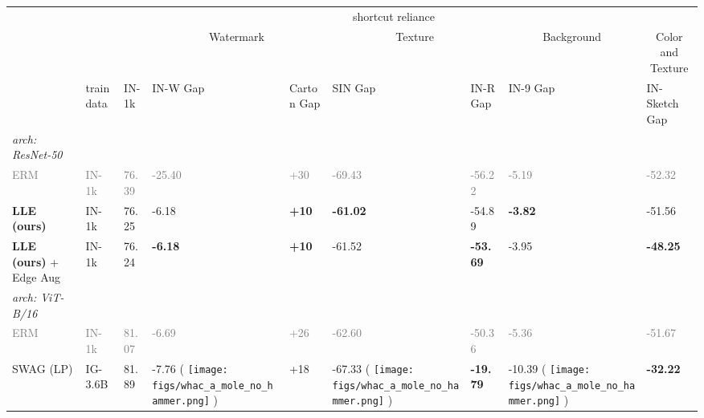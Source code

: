 \documentclass[10pt,twocolumn,letterpaper]{article}
\DeclareRobustCommand{\molenohammer}{\begingroup\normalfont
  \texttt{[image: figs/whac\_a\_mole\_no\_hammer.png]}\endgroup
}
\begin{document}
\begin{table*}[t]
\centering
\begin{adjustbox}{width=\linewidth}
\begin{tabular}{@{}lllllllll@{}}
\toprule
       &            & \multicolumn{1}{l|}{}      & \multicolumn{5}{c}{shortcut reliance}                                                                                 \\ \cmidrule(l){4-9}
       &            & \multicolumn{1}{c|}{}      & \multicolumn{2}{c|}{Watermark}             & \multicolumn{2}{c}{Texture}             & \multicolumn{1}{|c}{Background} & \multicolumn{1}{|c}{Color and Texture} \\
 & train data & \multicolumn{1}{l|}{IN-1k} & IN-W Gap & \multicolumn{1}{l|}{Carton Gap} & SIN Gap & \multicolumn{1}{l|}{IN-R Gap} & IN-9 Gap  & IN-Sketch Gap                     \\ \midrule
\textit{arch: ResNet-50}             &      &                    &          &           &          &         &      &           \\
\textcolor{gray}{ERM}              & \textcolor{gray}{IN-1k}      & \textcolor{gray}{76.39}       & \textcolor{gray}{-25.40}           & \textcolor{gray}{+30}          & \textcolor{gray}{-69.43}          & \textcolor{gray}{-56.22}          & \textcolor{gray}{-5.19}      &   \textcolor{gray}{-52.32}         \\
\textbf{LLE (ours)}    & IN-1k      & 76.25                   & -6.18             & \textbf{+10} & \textbf{-61.02} & -54.89 & \textbf{-3.82}   &    -51.56                     \\
\textbf{LLE (ours)} + Edge Aug    & IN-1k      & 76.24                   & \textbf{-6.18}             & \textbf{+10} & -61.52 & \textbf{-53.69} & -3.95    &    \textbf{-48.25}                   \\ \midrule
\textit{arch: ViT-B/16}             &      &                    &          &           &          &         &    &             \\
\textcolor{gray}{ERM}     & \textcolor{gray}{IN-1k}     & \textcolor{gray}{81.07}          & \textcolor{gray}{-6.69}   & \textcolor{gray}{+26}          & \textcolor{gray}{-62.60}    & \textcolor{gray}{-50.36}          & \textcolor{gray}{-5.36}    &   \textcolor{gray}{-51.67}         \\ \cmidrule{2-9}
SWAG (LP)              & IG-3.6B    & 81.89                  & -7.76  \scriptsize{(\textcolor{red}{} \molenohammer)}         & +18  & -67.33 \scriptsize{(\textcolor{red}{} \molenohammer)}         & \textbf{-19.79}           & -10.39 \scriptsize{(\textcolor{red}{} \molenohammer)}       &     \textbf{-32.22}              \\

\end{tabular}
\end{adjustbox}
\end{table*}
\end{document}
